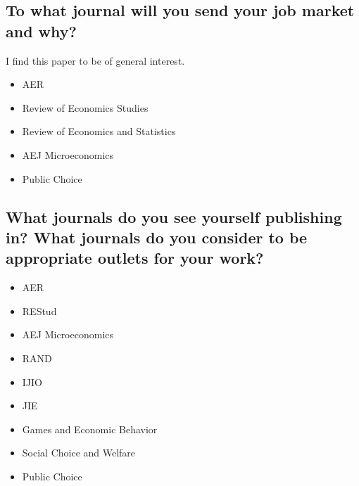 \documentclass[12pt]{article}
\theoremstyle{plain}
\theoremstyle{plain}
\theoremstyle{plain}
\theoremstyle{plain}
\theoremstyle{plain}
\theoremstyle{plain}
\begin{document}
\subsection{To what journal will you send your job market and why?}
\label{sec:org5167215}
I find this paper to be of general interest.
\begin{itemize}
\item AER
\item Review of Economics Studies
\item Review of Economics and Statistics
\item AEJ Microeconomics
\item Public Choice
\end{itemize}
\subsection{What journals do you see yourself publishing in? What journals do you consider to be appropriate outlets for your work?}
\label{sec:org972e757}
\begin{itemize}
\item AER
\item REStud
\item AEJ Microeconomics
\item RAND
\item IJIO
\item JIE
\item Games and Economic Behavior
\item Social Choice and Welfare
\item Public Choice
\end{itemize}
\end{document}
